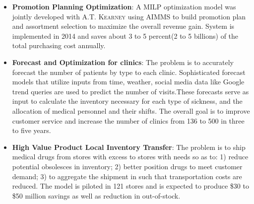 \documentclass[12pt,letterpaper,roman]{moderncv} %
\begin{document}
{} %
{

\begin{itemize}
\item \textbf{Promotion Planning Optimization}: A MILP optimization model was
jointly developed with \textsc{A.T. Kearney} using AIMMS to build promotion plan and
assortment selection to maximize the overall revenue gain. System is
implemented in 2014 and saves about 3 to 5 percent(2 to 5 billions) of the total purchasing cost annually.
\item \textbf{Forecast and Optimization for clinics}: The problem is
to accurately forecast the number of patients by type to each clinic.
Sophisticated forecast models that utilize inputs from time, weather, social
media data like Google trend queries are used to predict the number of
visits.These forecasts serve as input to calculate the inventory necessary for
each type of sickness, and the allocation of medical personnel and their
shifts. The overall goal is to improve customer service and increase the number
of clinics from 136 to 500 in three to five years.
\item \textbf{High Value Product Local Inventory Transfer}:  The problem is to ship 
medical drugs from stores with excess to stores with needs so as to: 1) reduce
potential obsolesces in inventory; 2) better position drugs to meet customer
demand; 3) to aggregate the shipment in such that transportation costs are
reduced. The model is piloted in 121 stores and is expected
to produce \$30 to \$50 million savings as well as reduction in
out-of-stock.
 


\end{itemize}

}
\end{document}
